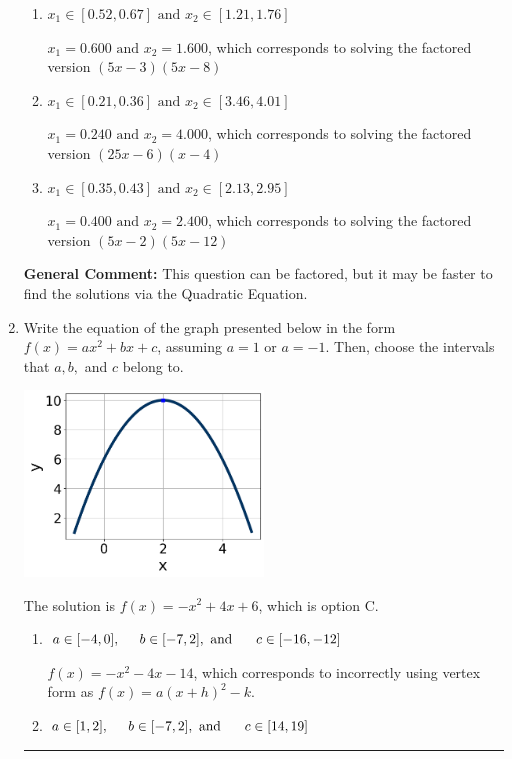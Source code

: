 \documentclass{extbook}[14pt]
\newcommand{\litem}[1]{\item #1

\rule{\textwidth}{0.4pt}}
\begin{document}
\begin{enumerate}
{\begin{enumerate}[label=\Alph*.]
$x_1 = 20.000 \text{ and } x_2 = 30.000$, which corresponds to solving the factored version $(x -20)(x -30)$
\item \( x_1 \in [0.52, 0.67] \text{ and } x_2 \in [1.21, 1.76] \)

$x_1 = 0.600 \text{ and } x_2 = 1.600$, which corresponds to solving the factored version $(5x -3)(5x -8)$
\item \( x_1 \in [0.21, 0.36] \text{ and } x_2 \in [3.46, 4.01] \)

$x_1 = 0.240 \text{ and } x_2 = 4.000$, which corresponds to solving the factored version $(25x -6)(x -4)$
\item \( x_1 \in [0.35, 0.43] \text{ and } x_2 \in [2.13, 2.95] \)

$x_1 = 0.400 \text{ and } x_2 = 2.400$, which corresponds to solving the factored version $(5x -2)(5x -12)$
\end{enumerate}

\textbf{General Comment:} This question can be factored, but it may be faster to find the solutions via the Quadratic Equation.
}
\litem{
Write the equation of the graph presented below in the form $f(x)=ax^2+bx+c$, assuming  $a=1$ or $a=-1$. Then, choose the intervals that $a, b,$ and $c$ belong to.

\begin{center}
    \includegraphics[width=0.5\textwidth]{../Figures/quadraticGraphToEquationCopyC.png}
\end{center}




The solution is \( f(x) = -x^{2} +4 x + 6 \), which is option C.\begin{enumerate}[label=\Alph*.]
\item \( a \in [-4, 0], \hspace*{5mm} b \in [-7, 2], \text{ and } \hspace*{5mm} c \in [-16, -12] \)

$f(x)=-x^{2} -4 x -14$, which corresponds to incorrectly using vertex form as $f(x) = a(x+h)^2 - k$.
\item \( a \in [1, 2], \hspace*{5mm} b \in [-7, 2], \text{ and } \hspace*{5mm} c \in [14, 19] \)


\end{enumerate}}
\end{enumerate}
\end{document}
